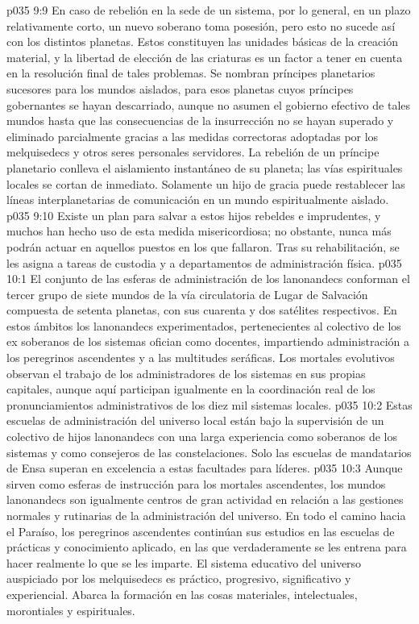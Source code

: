 \vs p035 9:9 \pc En caso de rebelión en la sede de un sistema, por lo general, en un plazo relativamente corto, un nuevo soberano toma posesión, pero esto no sucede así con los distintos planetas. Estos constituyen las unidades básicas de la creación material, y la libertad de elección de las criaturas es un factor a tener en cuenta en la resolución final de tales problemas. Se nombran príncipes planetarios sucesores para los mundos aislados, para esos planetas cuyos príncipes gobernantes se hayan descarriado, aunque no asumen el gobierno efectivo de tales mundos hasta que las consecuencias de la insurrección no se hayan superado y eliminado parcialmente gracias a las medidas correctoras adoptadas por los melquisedecs y otros seres personales servidores. La rebelión de un príncipe planetario conlleva el aislamiento instantáneo de su planeta; las vías espirituales locales se cortan de inmediato. Solamente un hijo de gracia puede restablecer las líneas interplanetarias de comunicación en un mundo espiritualmente aislado.
\vs p035 9:10 Existe un plan para salvar a estos hijos rebeldes e imprudentes, y muchos han hecho uso de esta medida misericordiosa; no obstante, nunca más podrán actuar en aquellos puestos en los que fallaron. Tras su rehabilitación, se les asigna a tareas de custodia y a departamentos de administración física.
\vs p035 10:1 El conjunto de las esferas de administración de los lanonandecs conforman el tercer grupo de siete mundos de la vía circulatoria de Lugar de Salvación compuesta de setenta planetas, con sus cuarenta y dos satélites respectivos. En estos ámbitos los lanonandecs experimentados, pertenecientes al colectivo de los ex soberanos de los sistemas ofician como docentes, impartiendo administración a los peregrinos ascendentes y a las multitudes seráficas. Los mortales evolutivos observan el trabajo de los administradores de los sistemas en sus propias capitales, aunque aquí participan igualmente en la coordinación real de los pronunciamientos administrativos de los diez mil sistemas locales.
\vs p035 10:2 Estas escuelas de administración del universo local están bajo la supervisión de un colectivo de hijos lanonandecs con una larga experiencia como soberanos de los sistemas y como consejeros de las constelaciones. Solo las escuelas de mandatarios de Ensa superan en excelencia a estas facultades para líderes.
\vs p035 10:3 Aunque sirven como esferas de instrucción para los mortales ascendentes, los mundos lanonandecs son igualmente centros de gran actividad en relación a las gestiones normales y rutinarias de la administración del universo. En todo el camino hacia el Paraíso, los peregrinos ascendentes continúan sus estudios en las escuelas de prácticas y conocimiento aplicado, en las que verdaderamente se les entrena para hacer realmente lo que se les imparte. El sistema educativo del universo auspiciado por los melquisedecs es práctico, progresivo, significativo y experiencial. Abarca la formación en las cosas materiales, intelectuales, morontiales y espirituales.
